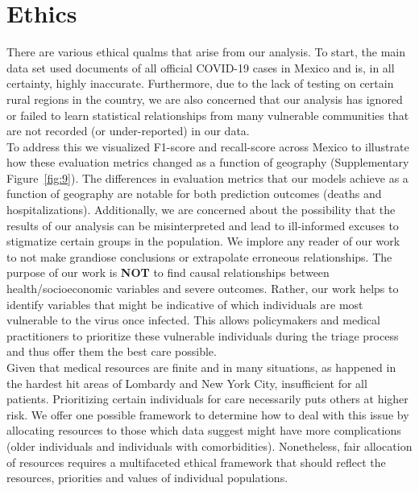 \documentclass[hidelinks,10pt]{article}
\begin{document}
	\section{Ethics}
	There are various ethical qualms that arise from our analysis.  To start, the main data set used documents of all official COVID-19 cases in Mexico and is, in all certainty, highly inaccurate. Furthermore, due to the lack of testing on certain rural regions in the country, we are also concerned that our analysis has ignored or failed to learn statistical relationships from  many vulnerable communities that are not recorded (or under-reported) in our data. \\To address this we visualized F1-score and recall-score across Mexico to illustrate how these evaluation metrics changed as a function of geography (Supplementary Figure~\ref{fig:9}). The differences in evaluation metrics that our models achieve as a function of geography are notable for both prediction outcomes (deaths and hospitalizations). Additionally, we are concerned about the possibility that the results of our analysis can be misinterpreted and lead to ill-informed excuses to stigmatize certain groups in the population. We implore any reader of our work to not make grandiose conclusions or extrapolate erroneous relationships. The purpose of our work is \textbf{NOT} to find causal relationships between health/socioeconomic variables and severe outcomes. Rather, our work helps to identify variables that might be indicative of which individuals are most vulnerable to the virus once infected. This allows policymakers and medical practitioners to prioritize these vulnerable individuals during the triage process and thus offer them the best care possible. \\
	Given that medical resources are finite and in many situations, as happened in the hardest hit areas of Lombardy and New York City, insufficient for all patients. Prioritizing certain individuals for care necessarily puts others at higher risk. We offer one possible framework to determine how to deal with this issue  by allocating resources to those which data suggest might have more complications (older individuals and individuals with comorbidities). Nonetheless, fair allocation of resources requires a multifaceted ethical framework that should reflect the resources, priorities and values of individual populations.
	
\end{document}
